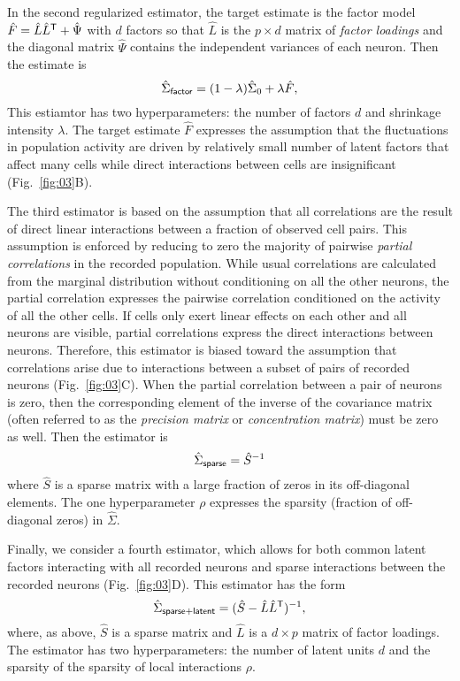 In the second regularized estimator, the target estimate is the factor model $\hat F = \hat L \hat L^{\sf T} + \hat \Psi$ with $d$ factors so that $\hat L$ is the $p\times d$ matrix of \emph{factor loadings} and the diagonal matrix $\hat \Psi$ contains the independent variances of each neuron.
Then the estimate is 
\begin{equation}
\hat \Sigma_{\sf factor} = (1-\lambda) \hat \Sigma_0 + \lambda \hat F,
\end{equation}
This estiamtor has two hyperparameters: the number of factors $d$ and shrinkage intensity $\lambda$. The target estimate $\hat F$ expresses the assumption that the fluctuations in population activity are driven by relatively small number of latent factors that affect many cells while direct interactions between cells are insignificant (Fig.~\ref{fig:03}B).   

The third estimator is based on the assumption that all correlations are the result of direct linear interactions between a fraction of observed cell pairs.  This assumption is enforced by reducing to zero the majority of pairwise \emph{partial correlations} in the recorded population. While usual correlations are calculated from the marginal distribution without conditioning on all the other neurons, the partial correlation expresses the pairwise correlation conditioned on the activity of all the other cells.  If cells only exert linear effects on each other and all neurons are visible, partial correlations express the direct interactions between neurons. Therefore, this estimator is biased toward the assumption that correlations arise due to interactions between a subset of pairs of recorded neurons (Fig.~\ref{fig:03}C). When the partial correlation between a pair of neurons is zero, then the corresponding element of the inverse of the covariance matrix (often referred to as the \emph{precision matrix} or \emph{concentration matrix}) must be zero as well. Then the estimator is 
\begin{equation}
\hat\Sigma_{\sf sparse} = \hat S^{-1}
\end{equation}
where $\hat S$ is a sparse matrix with a large fraction of zeros in its off-diagonal elements. The  one hyperparameter $\rho$ expresses the sparsity (fraction of off-diagonal zeros) in $\hat\Sigma$.


Finally, we consider a fourth estimator, which allows for both common latent factors interacting with all recorded neurons and sparse interactions between the recorded neurons (Fig.~\ref{fig:03}D). This estimator has the form
\begin{equation}
\hat\Sigma_{\sf sparse+latent} = (\hat S - \hat L\hat L^{\sf T})^{-1},
\end{equation}
where, as above, $\hat S$ is a sparse matrix and $\hat L$ is a $d\times p$ matrix of factor loadings. The estimator has two hyperparameters: the number of latent units $d$ and the sparsity of the sparsity of local interactions $\rho$.


